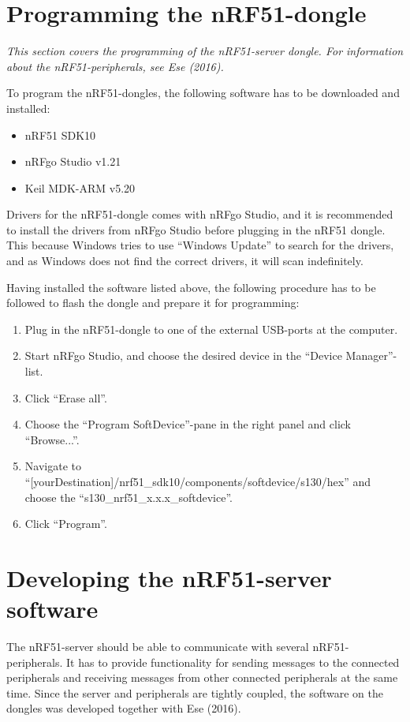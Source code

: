 \section{Programming the nRF51-dongle}
\label{sec:prognrf}
\textit{This section covers the programming of the nRF51-server dongle. For information about the nRF51-peripherals, see Ese (2016).}

\label{sec:nrfrequirements}
To program the nRF51-dongles, the following software has to be downloaded and installed:
\begin{itemize}
    \item nRF51 SDK10\cite{nrf51sdk}
    \item nRFgo Studio v1.21\cite{nrfgo}
    \item Keil MDK-ARM v5.20\cite{keil}
\end{itemize}
Drivers for the nRF51-dongle comes with nRFgo Studio, and it is recommended to install the drivers from nRFgo Studio before plugging in the nRF51 dongle. This because Windows tries to use ``Windows Update'' to search for the drivers, and as Windows does not find the correct drivers, it will scan indefinitely.

Having installed the software listed above, the following procedure has to be followed to flash the dongle and prepare it for programming:
\begin{enumerate}
    \item Plug in the nRF51-dongle to one of the external USB-ports at the computer.
    \item Start nRFgo Studio, and choose the desired device in the ``Device Manager''-list.
    \item Click ``Erase all''.
    \item Choose the ``Program SoftDevice''-pane in the right panel and click ``Browse...''.
    \item Navigate to ``[yourDestination]/nrf51\_sdk10/components/softdevice/s130/hex'' and choose the ``s130\_nrf51\_x.x.x\_softdevice''.
    \item Click ``Program''.
\end{enumerate}

\section{Developing the nRF51-server software}
\label{sec:devnrf}
The nRF51-server should be able to communicate with several nRF51-peripherals. It has to provide functionality for sending messages to the connected peripherals and receiving messages from other connected peripherals at the same time. Since the server and peripherals are tightly coupled, the software on the dongles was developed together with Ese (2016).

